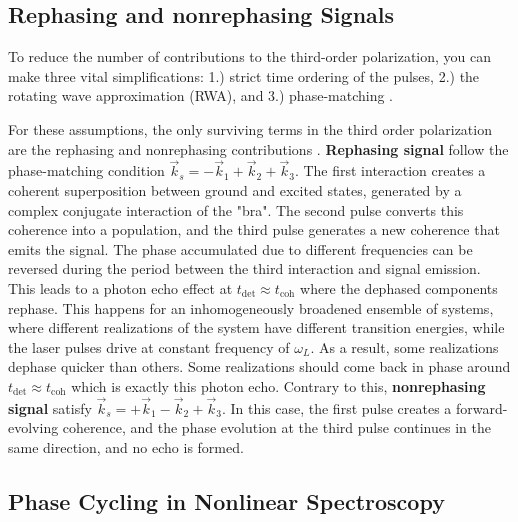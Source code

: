 \subsection{Rephasing and nonrephasing Signals}
\label{subsec:rephasing_nonrephasing}

\noindent 
To reduce the number of contributions to the third-order polarization, you can make three vital simplifications: 1.) strict time ordering of the pulses, 2.) the rotating wave approximation (RWA), and 3.) phase-matching \cite{hamm2005principlesnonlinearoptical,  %
mukamel1995principlesnonlinearoptical, cho2009twodimensionalopticalspectroscopy, jonas2003twodimensionalfemtosecondspectroscopy}.

For these assumptions, the only surviving terms in the third order polarization are the rephasing and nonrephasing contributions \cite{cho2009twodimensionalopticalspectroscopy, jonas2003twodimensionalfemtosecondspectroscopy}.
\textbf{Rephasing signal} follow the phase-matching condition $\vec{k}_s = -\vec{k}_1 + \vec{k}_2 + \vec{k}_3$. The first interaction creates a coherent superposition between ground and excited states, generated by a complex conjugate interaction of the "bra". The second pulse converts this coherence into a population, and the third pulse generates a new coherence that emits the signal. The phase accumulated due to different frequencies can be reversed during the period between the third interaction and signal emission. This leads to a photon echo effect at $t_{\text{det}} \approx t_{\text{coh}}$ where the dephased components rephase.
This happens for an inhomogeneously broadened ensemble of systems, where different realizations of the system have different transition energies, while the laser pulses drive at constant frequency of $\omega_L$. As a result, some realizations dephase quicker than others. Some realizations should come back in phase around $t_{\text{det}} \approx t_{\text{coh}}$ which is exactly this photon echo.
Contrary to this, \textbf{nonrephasing signal} satisfy $\vec{k}_s = +\vec{k}_1 - \vec{k}_2 + \vec{k}_3$. In this case, the first pulse creates a forward-evolving coherence, and the phase evolution at the third pulse continues in the same direction, and no echo is formed.


\subsection{Phase Cycling in Nonlinear Spectroscopy}
\label{subsec:phase_cycling}


